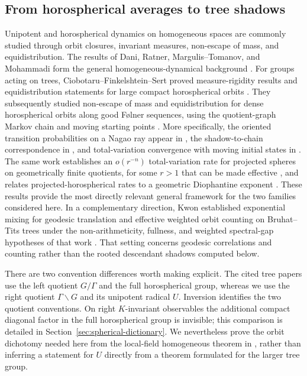 \documentclass[11pt]{amsart}
\theoremstyle{definition}
\theoremstyle{plain}
\begin{document}
\subsection{From horospherical averages to tree shadows}
Unipotent and horospherical dynamics on homogeneous spaces are commonly studied
through orbit closures, invariant measures, non-escape of mass, and
equidistribution.  The results of Dani, Ratner, Margulis--Tomanov, and Mohammadi
form the general homogeneous-dynamical background
\cite{Dani1981,Dani1984,Dani1986,Ratner1991Duke,Ratner1991Annals,
MargulisTomanov1994,Mohammadi2011}.  For groups acting on trees,
Ciobotaru--Finkelshtein--Sert proved measure-rigidity results and
equidistribution statements for large compact horospherical orbits
\cite[Proposition~1.6 and Corollary~1.7]{CFS2021}.  They subsequently studied
non-escape of mass and equidistribution for dense horospherical orbits along
good F{\o}lner sequences, using the quotient-graph Markov chain and moving
starting points \cite{CFS2022}.  More specifically, the oriented transition
probabilities on a Nagao ray appear in
\cite[Example~3.1]{CFS2022}, the shadow-to-chain correspondence in
\cite[Lemma~3.9]{CFS2022}, and total-variation convergence with moving initial
states in \cite[Lemma~3.6]{CFS2022}.  The same work establishes an
\(o(r^{-n})\) total-variation rate for projected spheres on geometrically
finite quotients, for some \(r>1\) that can be made effective
\cite[Theorem~E(3)]{CFS2022}, and relates projected-horospherical rates to a
geometric Diophantine exponent \cite[Remark~1.5]{CFS2022}.  These results
provide the most directly relevant general framework for the two families
considered here.  In a complementary direction, Kwon established exponential
mixing for geodesic translation and effective weighted orbit counting on
Bruhat--Tits trees under the non-arithmeticity, fullness, and weighted
spectral-gap hypotheses of that work \cite{Kwon2018}.  That setting concerns
geodesic correlations and counting rather than the rooted descendant shadows
computed below.

There are two convention differences worth making explicit.  The cited tree
papers use the left quotient \(G/\Gamma\) and the full horospherical group,
whereas we use the right quotient \(\Gamma\backslash G\) and its unipotent
radical \(U\).  Inversion identifies the two quotient conventions.  On
right \(K\)-invariant observables the additional compact diagonal factor in
the full horospherical group is invisible; this comparison is detailed in
Section~\ref{sec:spherical-dictionary}.  We nevertheless prove the orbit
dichotomy needed here from the local-field homogeneous theorem in
\cite[Corollary~4.2]{Mohammadi2011}, rather than inferring a statement for
\(U\) directly from a theorem formulated for the larger tree group.
\end{document}
